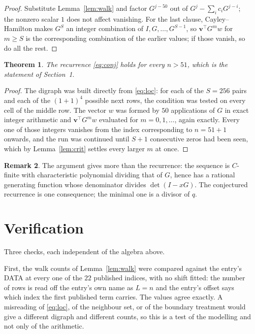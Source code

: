 \documentclass[11pt,a4paper]{article}
\theoremstyle{plain}
\newtheorem{theorem}{Theorem}
\theoremstyle{definition}
\newtheorem{remark}[theorem]{Remark}
\begin{document}
\begin{proof}
Substitute Lemma~\ref{lem:walk} and factor $G^{j-50}$ out of
$G^{j}-\sum_ic_iG^{j-i}$; the nonzero scalar $1$ does not affect
vanishing. For the last clause, Cayley--Hamilton makes $G^{S}$ an integer combination of
$I,G,\dots,G^{S-1}$, so $\mathbf{v}^{\!\top}G^{m}w$ for $m\ge S$ is the corresponding
combination of the earlier values; if those vanish, so do all the rest.
\end{proof}

\begin{theorem}
The recurrence \eqref{eq:conj} holds for every $n>51$, which is the statement of
Section~1.
\end{theorem}

\begin{proof}
The digraph was built directly from \eqref{eq:loc}: for each of the $S=256$ pairs and each
of the $(1+1)^{4}$ possible next rows, the condition was tested on every cell of
the middle row. The vector $w$ was formed by $50$ applications of $G$ in exact integer
arithmetic and $\mathbf{v}^{\!\top}G^{m}w$ evaluated for $m=0,1,\dots$, again exactly.
Every one of those integers vanishes from the index corresponding to $n=51+1$ onwards,
and the run was continued until $S+1$ consecutive zeros had been seen, which by
Lemma~\ref{lem:crit} settles every larger $m$ at once.
\end{proof}

\begin{remark}
The argument gives more than the recurrence: the sequence is $C$-finite with characteristic
polynomial dividing that of $G$, hence has a rational generating function whose denominator
divides $\det(I-xG)$. The conjectured recurrence is one consequence; the minimal one is a
divisor of $q$.
\end{remark}

\section{Verification}

Three checks, each independent of the algebra above.

First, the walk counts of Lemma~\ref{lem:walk} were compared against the entry's DATA at
every one of the $22$ published indices, with no shift fitted: the number of rows is
read off the entry's own name as $L=n$ and the entry's offset says which index the first
published term carries. The values agree exactly. A misreading of \eqref{eq:loc}, of the
neighbour set, or of the boundary treatment would give a different digraph and different
counts, so this is a test of the modelling and not only of the arithmetic.
\end{document}
